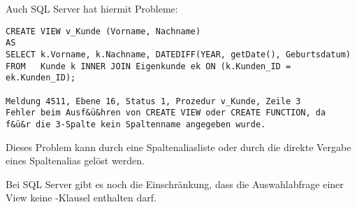 \clearpage
        Auch SQL Server hat hiermit Probleme:
        \begin{lstlisting}[language=ms_sql,caption={Eine View mit einer berechneten Spalte in SQL Server},label=sql08_34]
CREATE VIEW v_Kunde (Vorname, Nachname)
AS
SELECT k.Vorname, k.Nachname, DATEDIFF(YEAR, getDate(), Geburtsdatum)
FROM   Kunde k INNER JOIN Eigenkunde ek ON (k.Kunden_ID = ek.Kunden_ID);

Meldung 4511, Ebene 16, Status 1, Prozedur v_Kunde, Zeile 3
Fehler beim Ausf&ü&hren von CREATE VIEW oder CREATE FUNCTION, da
f&ü&r die 3-Spalte kein Spaltenname angegeben wurde.
        \end{lstlisting}
        Dieses Problem kann durch eine Spaltenaliasliste oder durch die direkte Vergabe eines Spaltenalias gelöst werden.

        \begin{merke}
          Bei SQL Server gibt es noch die Einschränkung, dass die Auswahlabfrage einer View keine \ORDERBY-Klausel enthalten darf.
        \end{merke}
